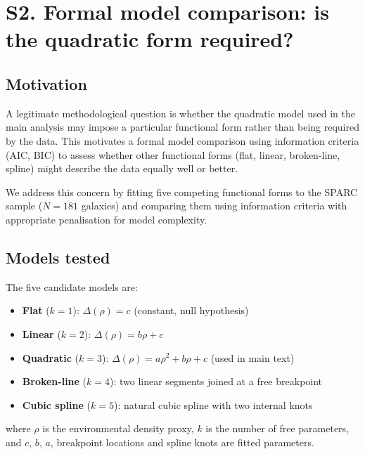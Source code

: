 
\section*{S2. Formal model comparison: is the quadratic form required?}
\label{sec:S2}

\subsection*{Motivation}

A legitimate methodological question is whether the
quadratic model used in the main analysis may impose a particular
functional form rather than being required by the data. This motivates
a formal model comparison using information criteria (AIC,
BIC) to assess whether other functional forms (flat, linear, broken-line,
spline) might describe the data equally well or better.

We address this concern by fitting five competing functional forms to
the SPARC sample ($N = 181$ galaxies) and comparing them using
information criteria with appropriate penalisation for model complexity.

\subsection*{Models tested}

The five candidate models are:

\begin{itemize}
    \item \textbf{Flat} ($k = 1$): $\Delta(\rho) = c$ (constant, null hypothesis)
    \item \textbf{Linear} ($k = 2$): $\Delta(\rho) = b\rho + c$
    \item \textbf{Quadratic} ($k = 3$): $\Delta(\rho) = a\rho^2 + b\rho + c$ (used in main text)
    \item \textbf{Broken-line} ($k = 4$): two linear segments joined at a free breakpoint
    \item \textbf{Cubic spline} ($k = 5$): natural cubic spline with two internal knots
\end{itemize}

where $\rho$ is the environmental density proxy, $k$ is the number of
free parameters, and $c$, $b$, $a$, breakpoint locations and spline
knots are fitted parameters.

